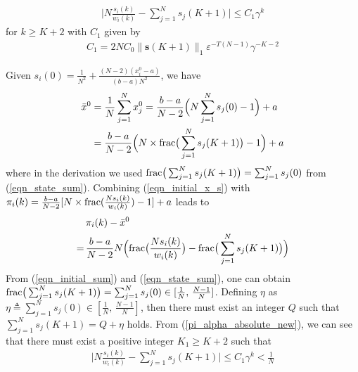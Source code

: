 \documentclass{IEEEtran}
\begin{document}
\begin{equation}\label{pi_alpha_absolute_new}
	\begin{aligned}
		\big| N \frac{s_i(k)}{w_i(k)}- \sum_{j=1}^{N}s_j(K+1) \big| \leq C_1 \gamma^k
	\end{aligned}
\end{equation}
for $k\geq K+2$ with $C_1$ given by
\begin{equation}\label{eqn_C_1}
	\begin{aligned}
		C_1=2 N C_0 \big\|\mathbf{s}(K+1)\big\|_1 \varepsilon^{-T(N-1)} \gamma^{-K-2}
	\end{aligned}
\end{equation}

Given $s_i(0)= \frac{1}{N^2} + \frac{(N-2)(x_i^0-a)}{(b-a)N^2}$, we have
\begin{equation}\label{eqn_initial_x_s}
	\begin{aligned}
		\bar{x}^0 & = \frac{1}{N} \sum_{j=1}^{N}x_j^0 = \frac{b-a}{N-2}\Big(N\sum_{j=1}^{N}s_j(0)-1\Big)+a \\
		& = \frac{b-a}{N-2}\Big(N \times {\rm frac}\big(\sum_{j=1}^{N} s_j(K+1)\big)-1\Big)+a
	\end{aligned}
\end{equation}
where in the derivation we used ${\rm frac}\big(\sum_{j=1}^{N} s_j(K+1)\big) = \sum_{j=1}^{N} s_j(0)$ from (\ref{eqn_state_sum}). Combining (\ref{eqn_initial_x_s}) with $\pi_i(k)=\frac{b-a}{N-2}[N \times {\rm frac}(\frac{Ns_i(k)}{w_i(k)})-1]+a$ leads to
\begin{equation}\label{eqn_estimate_error}
	\begin{aligned}
		& \pi_i(k)-\bar{x}^0 \\
		= \, & \frac{b-a}{N-2}N\Big({\rm frac}\big( \frac{Ns_i(k)}{w_i(k)} \big) - {\rm frac}\big( \sum_{j=1}^{N} s_j(K+1) \big) \Big)
	\end{aligned}
\end{equation}
From (\ref{eqn_initial_sum}) and (\ref{eqn_state_sum}), one can obtain ${\rm frac}\big( \sum_{j=1}^{N} s_j(K+1) \big)=\sum_{j=1}^{N} s_j(0) \in [\frac{1}{N}, \, \frac{N-1}{N}]$. Defining $\eta$ as $\eta \triangleq \sum_{j=1}^{N} s_j(0) \in [\frac{1}{N}, \, \frac{N-1}{N}]$, then there must exist an integer $Q$ such that $\sum_{j=1}^{N} s_j(K+1)=Q+\eta$ holds. From (\ref{pi_alpha_absolute_new}), we can see that there must exist a positive integer $K_1 \geq K+2$ such that
\begin{equation}\label{eqn_estimate_error_1}
	\begin{aligned}
		\big| N \frac{s_i(k)}{w_i(k)}- \sum_{j=1}^{N}s_j(K+1) \big| \leq C_1 \gamma^k < \frac{1}{N}
	\end{aligned}
\end{equation}
\end{document}
